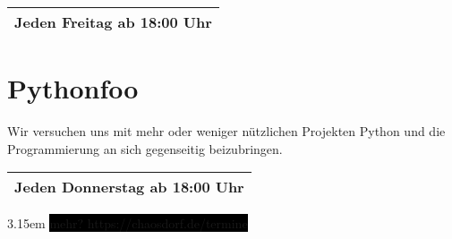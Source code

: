 \documentclass{article}
\begin{document}
    \begin{tabular}{ c }
        \\
        \hline
        Jeden Freitag ab 18:00 Uhr \\
        \hline
    \end{tabular}

    \section*{Pythonfoo}
    Wir versuchen uns mit mehr oder weniger nützlichen Projekten Python und
    die Programmierung an sich gegenseitig beizubringen.

    \begin{tabular}{ c }
        \\
        \hline
        Jeden Donnerstag ab 18:00 Uhr \\
        \hline
    \end{tabular}

    \vfill

    \hspace*{-6.2em}
    \fboxsep3.15em
    \colorbox{black}{
        \begingroup
            \color{white}
            mehr?
            https://chaosdorf.de/termine
        \endgroup
    }
\end{document}
